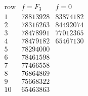 \[
\begin{array}{c|r|r}
\text{row}&f=F_3&f=0\\ \hline
1&78813928&83874182\\
2&78316263&84492074\\
3&78478991&77012365\\
4&78479182&65467130\\
5&78294000&\\
6&78461598&\\
7&77466558&\\
8&76864869&\\
9&75668322&\\
10&65463863&
\end{array}
\]
